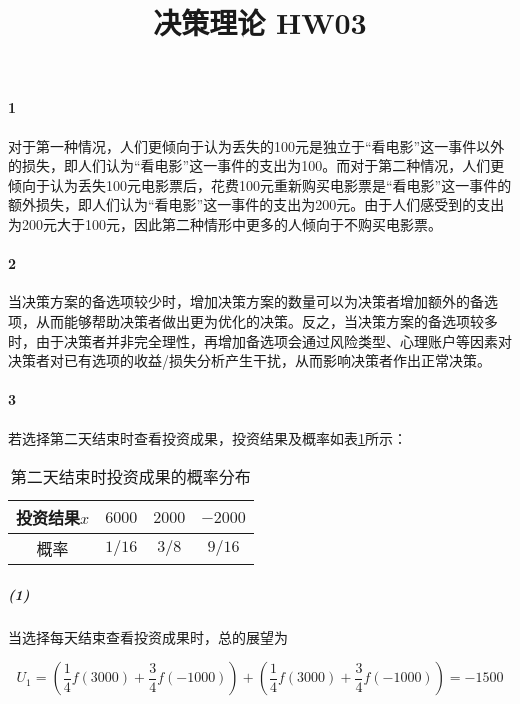 \documentclass{../notes}
\title{决策理论 HW03}
\begin{document}
\maketitle

\paragraph*{1} 对于第一种情况，人们更倾向于认为丢失的100元是独立于“看电影”这一事件以外的损失，即人们认为“看电影”这一事件的支出为100。而对于第二种情况，人们更倾向于认为丢失100元电影票后，花费100元重新购买电影票是“看电影”这一事件的额外损失，即人们认为“看电影”这一事件的支出为200元。由于人们感受到的支出为200元大于100元，因此第二种情形中更多的人倾向于不购买电影票。

\separate

\paragraph*{2} 当决策方案的备选项较少时，增加决策方案的数量可以为决策者增加额外的备选项，从而能够帮助决策者做出更为优化的决策。反之，当决策方案的备选项较多时，由于决策者并非完全理性，再增加备选项会通过风险类型、心理账户等因素对决策者对已有选项的收益/损失分析产生干扰，从而影响决策者作出正常决策。

\separate

\paragraph*{3} 若选择第二天结束时查看投资成果，投资结果及概率如表\ref{tbl:two-days}所示：

\begin{table}[ht]
    \centering
    \caption{第二天结束时投资成果的概率分布}
    \label{tbl:two-days}
    \begin{tabular}{*{4}{c}}
        \toprule
        投资结果$x$ & $6000$ & $2000$ & $-2000$ \\
        \midrule
        概率      & $1/16$ & $3/8$  & $9/16$  \\
        \bottomrule
    \end{tabular}
\end{table}

\subparagraph*{(1)} 当选择每天结束查看投资成果时，总的展望为

\begin{equation}
    U_1 = \left(\frac 14f(3000) + \frac 34f(-1000)\right) + \left(\frac 14f(3000) + \frac 34f(-1000)\right) = -1500
\end{equation}
\end{document}
